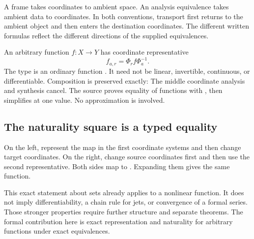 \begin{keyidea}[title={Two directions for exact coordinates}]
A frame takes coordinates to ambient space. An analysis equivalence takes
ambient data to coordinates. In both conventions, transport first returns
to the ambient object and then enters the destination coordinates. The
different written formulas reflect the different directions of the supplied
equivalences.
\end{keyidea}

An arbitrary function $f:X\to Y$ has coordinate representative
\[
 f_{a,r}=\Phi_r f\Phi_a^{-1}.
\]
The type is an ordinary function . It need not be linear, invertible, continuous, or differentiable. Composition is preserved exactly:
The middle coordinate analysis and synthesis cancel. The source proves equality of functions with , then simplifies at one value. No approximation is involved.

\subsection{The naturality square is a typed equality}
On the left, represent the map in the first coordinate systems and then change target coordinates. On the right, change source coordinates first and then use the second representative. Both sides map  to . Expanding them gives the same function.

This exact statement about sets already applies to a nonlinear function. It does not imply differentiability, a chain rule for jets, or convergence of a formal series. Those stronger properties require further structure and separate theorems. The formal contribution here is exact representation and naturality for arbitrary functions under exact equivalences.
